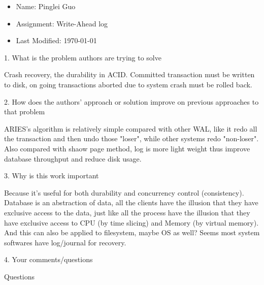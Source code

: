 \documentclass[12pt,a4paper,oneside]{article}
\begin{document}
\begin{itemize}
  \item Name: Pinglei Guo
  \item Assignment: Write-Ahead log
  \item Last Modified: \today
\end{itemize}

1. What is the problem authors are trying to solve

\medskip

Crash recovery, the durability in ACID. Committed transaction must be written to disk, on going transactions
aborted due to system crash must be rolled back.

\bigskip

2. How does the authors’ approach or solution improve on previous approaches to that problem

\medskip

ARIES's algorithm is relatively simple compared with other WAL, like it redo all the transaction and then undo
those "loser", while other systems redo "non-loser". Also compared with shaow page method, log is more light weight
thus improve database throughput and reduce disk usage.

\bigskip

3. Why is this work important

\medskip

Because it's useful for both durability and concurrency control (consistency).
Database is an abstraction of data, all the clients have the illusion that they
have exclusive access to the data, just like all the process have the illusion that
they have exclusive access to CPU (by time slicing) and Memory (by virtual memory).
And this can also be applied to filesystem, maybe OS as well? Seems most system
softwares have log/journal for recovery.

\bigskip

4. Your comments/questions

\medskip

Questions
\end{document}
